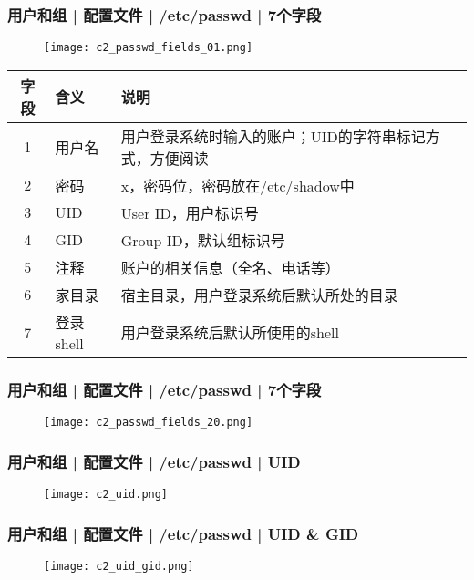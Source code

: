 \begin{frame}
  \frametitle{用户和组 | 配置文件 | /etc/passwd | \alert{7个字段}}
  \vspace{-0.5cm}
  \begin{figure}
    \centering
    \texttt{[image: c2\_passwd\_fields\_01.png]}
  \end{figure}
  \pause
  \vspace{-0.5cm}
  \begin{table}
    \centering
    \begin{tabularx}{\textwidth}{clX}
      \hline
      \rowcolor{blue!50}字段 & 含义 & 说明\\
      \hline
      1 & 用户名 & 用户登录系统时输入的账户；UID的字符串标记方式，方便阅读\\
      2 & 密码 & x，密码位，密码放在/etc/shadow中\\
      3 & UID & User ID，用户标识号\\
      4 & GID & Group ID，默认组标识号\\
      5 & 注释 & 账户的相关信息（全名、电话等）\\
      6 & 家目录 & 宿主目录，用户登录系统后默认所处的目录\\
      7 & 登录shell & 用户登录系统后默认所使用的shell\\
      \hline
    \end{tabularx}
  \end{table}
\end{frame}

\begin{frame}
  \frametitle{用户和组 | 配置文件 | /etc/passwd | 7个字段}
  \begin{figure}
    \centering
    \texttt{[image: c2\_passwd\_fields\_20.png]}
  \end{figure}
\end{frame}

\begin{frame}
  \frametitle{用户和组 | 配置文件 | /etc/passwd | UID}
  \begin{figure}
    \centering
    \texttt{[image: c2\_uid.png]}
  \end{figure}
\end{frame}

\begin{frame}
  \frametitle{用户和组 | 配置文件 | /etc/passwd | UID \& GID}
  \begin{figure}
    \centering
    \texttt{[image: c2\_uid\_gid.png]}
  \end{figure}
\end{frame}

